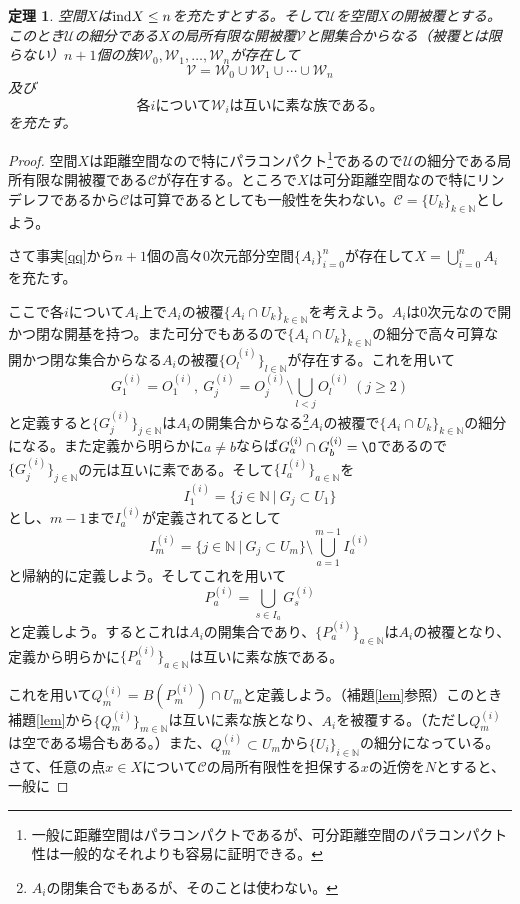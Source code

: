 \documentclass[leqno]{jsarticle}
\newtheorem{thm}{定理}
\newcommand{\nn}{\mathbb{N}}
\newcommand{\dpst}{\displaystyle}
\newcommand{\ind}{\text{{\rm ind}}}
\begin{document}
\begin{thm}\label{main}
空間$X$は$\ind X\le n$を充たすとする。そして$\mathcal{U}$を空間$X$の開被覆とする。このとき$\mathcal{U}$の細分である$X$の局所有限な開被覆$\mathcal{V}$と開集合からなる（被覆とは限らない）$n+1$個の族$\mathcal{W}_0,\mathcal{W}_1,\dots,\mathcal{W}_n$が存在して
\[
\mathcal{V}=\mathcal{W}_0\cup\mathcal{W}_1\cup\cdots\cup\mathcal{W}_n
\]
及び
\[
\text{各$i$について$\mathcal{W}_i$は互いに素な族である。}
\]
を充たす。
\end{thm}
\begin{proof}
空間$X$は距離空間なので特にパラコンパクト\footnote{一般に距離空間はパラコンパクトであるが、可分距離空間のパラコンパクト性は一般的なそれよりも容易に証明できる。}であるので$\mathcal{U}$の細分である局所有限な開被覆である$\mathcal{C}$が存在する。ところで$X$は可分距離空間なので特にリンデレフであるから$\mathcal{C}$は可算であるとしても一般性を失わない。$\mathcal{C}=\{U_k\}_{k\in \nn}$としよう。\par
さて事実\ref{qq}から$n+1$個の高々$0$次元部分空間$\{A_i\}_{i=0}^n$が存在して$\dpst X=\bigcup_{i=0}^nA_i$を充たす。\par
ここで各$i$について$A_i$上で$A_i$の被覆$\{A_i\cap U_k\}_{k\in \nn}$を考えよう。$A_i$は$0$次元なので開かつ閉な開基を持つ。また可分でもあるので$\{A_i\cap U_k\}_{k\in \nn}$の細分で高々可算な開かつ閉な集合からなる$A_i$の被覆$\{O_l^{(i)}\}_{l\in \nn}$が存在する。これを用いて
\[
G_1^{(i)}=O_1^{(i)},\ G_j^{(i)}=O_j^{(i)}\setminus \bigcup_{l<j}O_l^{(i)}\ (j\ge 2)
\]
と定義すると$\{G_j^{(i)}\}_{j\in \nn}$は$A_i$の開集合からなる\footnote{$A_i$の閉集合でもあるが、そのことは使わない。}$A_i$の被覆で$\{A_i\cap U_k\}_{k\in \nn}$の細分になる。また定義から明らかに$a\neq b$ならば$G_a^{(i)}\cap G_b^{(i)}=\O$であるので$\{G_j^{(i)}\}_{j\in \nn}$の元は互いに素である。そして$\{I_a^{(i)}\}_{a\in \nn}$を
\[
I_{1}^{(i)}=\{j\in \nn\ |\ G_j\subset U_1\}
\]
とし、$m-1$まで$I_a^{(i)}$が定義されてるとして
\[
I_m^{(i)}=\{j\in\nn\ |\ G_j\subset U_m\}\setminus \bigcup_{a=1}^{m-1}I_{a}^{(i)}
\]
と帰納的に定義しよう。そしてこれを用いて
\[
P_a^{(i)}=\bigcup_{s\in I_a}G_s^{(i)}
\]
と定義しよう。するとこれは$A_i$の開集合であり、$\{P_a^{(i)}\}_{a\in \nn}$は$A_i$の被覆となり、定義から明らかに$\{P_a^{(i)}\}_{a\in \nn}$は互いに素な族である。\par
これを用いて$Q_m^{(i)}=B(P_m^{(i)})\cap U_m$と定義しよう。（補題\ref{lem}参照）このとき補題\ref{lem}から$\{Q_m^{(i)}\}_{m\in \nn}$は互いに素な族となり、$A_i$を被覆する。（ただし$Q_m^{(i)}$は空である場合もある。）また、$Q_m^{(i)}\subset U_m$から$\{U_i\}_{i\in \nn}$の細分になっている。さて、任意の点$x\in X$について$\mathcal{C}$の局所有限性を担保する$x$の近傍を$N$とすると、一般に

\end{proof}
\end{document}
